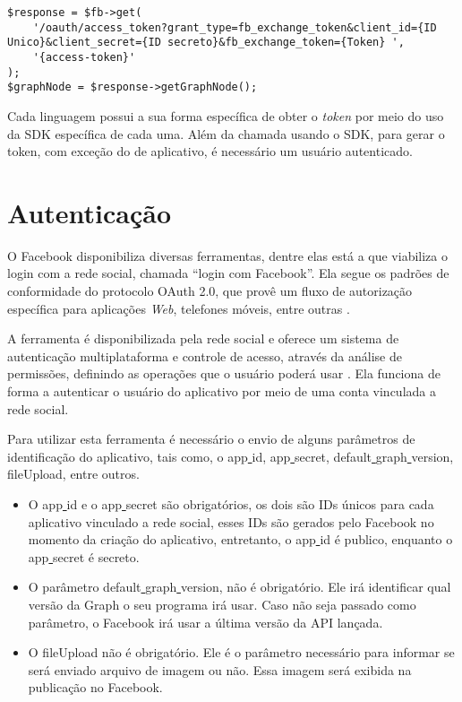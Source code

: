 \begin{lstlisting}[caption={Obtendo Token Infinito},label={lst:tokeninfinito}]
$response = $fb->get(
    '/oauth/access_token?grant_type=fb_exchange_token&client_id={ID Unico}&client_secret={ID secreto}&fb_exchange_token={Token} ',
    '{access-token}'
);
$graphNode = $response->getGraphNode();
\end{lstlisting}

Cada linguagem possui a sua forma específica de obter o \textit{token} por meio do uso da SDK específica de cada uma. Além da chamada usando o SDK, para gerar o token, com exceção do de aplicativo, é necessário um usuário autenticado.

\section{Autenticação}
\label{sec:autenticacao}
O Facebook disponibiliza diversas ferramentas, dentre elas está a que viabiliza o login com a rede social, chamada ``login com Facebook''. Ela segue os padrões de conformidade do protocolo OAuth 2.0, que provê um fluxo de autorização específica para aplicações \textit{Web}, telefones móveis, entre outras \cite{oauth2018}. 

A ferramenta é disponibilizada pela rede social e oferece um sistema de autenticação multiplataforma e controle de acesso, através da análise de permissões, definindo as operações que o usuário poderá usar \cite{facebook2018c}. Ela funciona de forma a autenticar o usuário do aplicativo por meio de uma conta vinculada a rede social.

Para utilizar esta ferramenta é necessário o envio de alguns parâmetros de identificação do aplicativo, tais como, o app\underline{{ }}id, app\underline{{ }}secret, default\underline{{ }}graph\underline{{ }}version, fileUpload, entre outros.

\begin{itemize}
\item O app\underline{{ }}id e o app\underline{{ }}secret são obrigatórios, os dois são IDs únicos para cada aplicativo vinculado a rede social, esses IDs são gerados pelo Facebook no momento da criação do aplicativo, entretanto, o app\underline{{ }}id é publico, enquanto o app\underline{{ }}secret é secreto.

\item O parâmetro default\underline{{ }}graph\underline{{ }}version, não é obrigatório. Ele irá identificar qual versão da Graph o seu programa irá usar. Caso não seja passado como parâmetro, o Facebook irá usar a última versão da API lançada.

\item O fileUpload não é obrigatório. Ele é o parâmetro necessário para informar se será enviado arquivo de imagem ou não. Essa imagem será exibida na publicação no Facebook.
\end{itemize}

